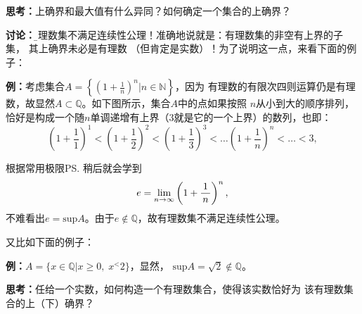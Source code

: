 	{\bf 思考：}上确界和最大值有什么异同？如何确定一个集合的上确界？
	
	{\bf 讨论：}{\b 有理数集不满足连续性公理！}准确地说就是：有理数集的非空有上界的子集，
	其上确界未必是有理数	（但肯定是实数）！为了说明这一点，来看下面的例子：
	
	{\bf 例：}考虑集合$A=\left\{\left(1+\frac 1n\right)^n|n\in\mathbb{N}\right\}$，因为
	有理数的有限次四则运算仍是有理数，故显然$A\subset\mathbb{Q}$。如下图所示，集合$A$中的点如果按照
	$n$从小到大的顺序排列，恰好是构成一个随$n$单调递增有上界（$3$就是它的一个上界）的数列，也即：
	$$\left(1+\frac11\right)^1<\left(1+\frac12\right)^2<\left(1+\frac13\right)^3<\ldots
	\left(1+\frac1n\right)^n<\ldots<3,$$
	\begin{center}
	\end{center}
	根据常用极限\ps{稍后就会学到}
	$$e=\lim\limits_{n\to\infty}\left(1+\displaystyle\frac{\,{1}\,}{\,{n}\,}\right)^n,$$
	不难看出$e=\mathrm{sup}A$。由于$e\notin\mathbb{Q}$，故有理数集不满足连续性公理。
	
	又比如下面的例子：
	
	{\bf 例：}$A=\{x\in\mathbb{Q}|x\geq 0,\;x^<2\}$，显然，
	$\mathrm{sup}A=\sqrt2\notin\mathbb{Q}$。
	
	{\bf 思考：}任给一个实数，如何构造一个有理数集合，使得该实数恰好为
	该有理数集合的上（下）确界？
	
